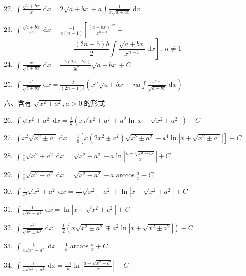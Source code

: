 22. \(\int \frac{\sqrt{a + {bx}}}{x}\mathrm{\;d}x = 2\sqrt{a + {bx}} + a\int \frac{1}{x\sqrt{a + {bx}}}\mathrm{\;d}x\)

23. \(\int \frac{\sqrt{a + {bx}}}{{x}^{n}}\mathrm{\;d}x = \frac{-1}{a\left( {n - 1}\right) }\left\lbrack  {\frac{{\left( a + bx\right) }^{3/2}}{{x}^{n - 1}} + }\right.\)
\[
\left. {\frac{\left( {{2n} - 5}\right) b}{2}\int \frac{\sqrt{a + {bx}}}{{x}^{n - 1}}\mathrm{\;d}x}\right\rbrack  ,\;n \neq  1
\]
24. \(\int \frac{x}{\sqrt{a + {bx}}}\mathrm{\;d}x = \frac{-2\left( {{2a} - {bx}}\right) }{3{b}^{2}}\sqrt{a + {bx}} + C\)

25. \(\int \frac{{x}^{n}}{\sqrt{a + {bx}}}\mathrm{\;d}x = \frac{2}{\left( {{2n} + 1}\right) b}\left( {{x}^{n}\sqrt{a + {bx}} - {na}\int \frac{{x}^{n - 1}}{\sqrt{a + {bx}}}\mathrm{\;d}x}\right)\)

六、含有 \(\sqrt{{x}^{2} \pm  {a}^{2}},a > 0\) 的形式

26. \(\int \sqrt{{x}^{2} \pm  {a}^{2}}\mathrm{\;d}x = \frac{1}{2}\left( {x\sqrt{{x}^{2} \pm  {a}^{2}} \pm  {a}^{2}\ln \left| {x + \sqrt{{x}^{2} \pm  {a}^{2}}}\right| }\right)  + C\)

27. \(\int {x}^{2}\sqrt{{x}^{2} \pm  {a}^{2}}\mathrm{\;d}x = \frac{1}{8}\left\lbrack  {x\left( {2{x}^{2} \pm  {a}^{2}}\right) \sqrt{{x}^{2} \pm  {a}^{2}} - {a}^{4}\ln \left| {x + \sqrt{{x}^{2} \pm  {a}^{2}}}\right| }\right\rbrack   + C\)

28. \(\int \frac{1}{x}\sqrt{{x}^{2} + {a}^{2}}\mathrm{\;d}x = \sqrt{{x}^{2} + {a}^{2}} - a\ln \left| \frac{a + \sqrt{{x}^{2} + {a}^{2}}}{x}\right|  + C\)

29. \(\int \frac{1}{x}\sqrt{{x}^{2} - {a}^{2}}\mathrm{\;d}x = \sqrt{{x}^{2} - {a}^{2}} - a\arccos \frac{a}{x} + C\)

30. \(\int \frac{1}{{x}^{2}}\sqrt{{x}^{2} \pm  {a}^{2}}\mathrm{\;d}x = \frac{-1}{x}\sqrt{{x}^{2} \pm  {a}^{2}} + \ln \left| {x + \sqrt{{x}^{2} \pm  {a}^{2}}}\right|  + C\)

31. \(\int \frac{1}{\sqrt{{x}^{2} \pm  {a}^{2}}}\mathrm{\;d}x = \ln \left| {x + \sqrt{{x}^{2} \pm  {a}^{2}}}\right|  + C\)

32. \(\int \frac{{x}^{2}}{\sqrt{{x}^{2} \pm  {a}^{2}}}\mathrm{\;d}x = \frac{1}{2}\left( {x\sqrt{{x}^{2} \pm  {a}^{2}} \mp  {a}^{2}\ln \left| {x + \sqrt{{x}^{2} \pm  {a}^{2}}}\right| }\right)  + C\)

33. \(\int \frac{1}{x\sqrt{{x}^{2} - {a}^{2}}}\mathrm{\;d}x = \frac{1}{a}\arccos \frac{a}{x} + C\)

34. \(\int \frac{1}{x\sqrt{{x}^{2} + {a}^{2}}}\mathrm{\;d}x = \frac{-1}{a}\ln \left| \frac{a + \sqrt{{x}^{2} + {a}^{2}}}{x}\right|  + C\)

